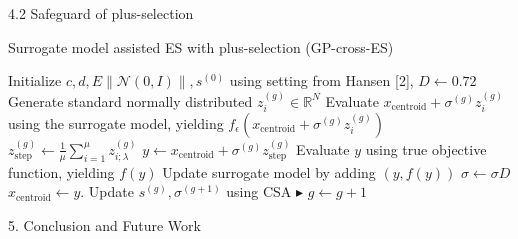 \documentclass{beamer}
\begin{document}
\begin{frame}{4.2 Safeguard of plus-selection}


\begin{block}{Surrogate model assisted ES with plus-selection (GP-cross-ES)}
 \footnotesize{
    \begin{algorithm}[H]
    \begin{algorithmic}[1]
        \STATE Initialize $c,d,E \left\lVert \mathcal{N}(0,I) \right\rVert,s^{(0)}$  using setting from Hansen [2], $D \leftarrow 0.72$
    		\STATE Generate standard normally distributed $z_i^{(g)} \in \mathbb{R}^N $
    		\STATE Evaluate $x_{\text{centroid}}+ \sigma^{(g)} z_i^{(g)}$ using the surrogate model, yielding $f_{\epsilon}(x_{\text{centroid}} + \sigma^{(g)} z_i^{(g)})$
    	\ENDFOR
    	\STATE $z_{\text{step}}^{(g)} \leftarrow \frac{1}{\mu}\sum_{i=1}^{\mu} z_{i;\lambda}^{(g)}$
    	\STATE $y  \leftarrow  x_{\text{centroid}} + \sigma^{(g)} z_{\text{step}}^{(g)}$ 
    	\STATE Evaluate $y$ using true objective function, yielding $f(y)$
    	\STATE Update surrogate model by adding $(y,f(y))$
    		\STATE $\sigma \leftarrow \sigma D$
    	\ELSE
    		\STATE $ x_{\text{centroid}} \leftarrow y $. Update $s^{(g)},\sigma^{(g+1)}$ using CSA \hfill$\blacktriangleright$ %
    	\ENDIF
    	\STATE $g \leftarrow g + 1$
    \ENDWHILE
    \end{algorithmic}
    \end{algorithm}
}
\end{block}
\end{frame}

\begin{frame}[plain,c]
\begin{center}
\Huge 5. Conclusion and Future Work
\end{center}
\end{frame}
\end{document}
